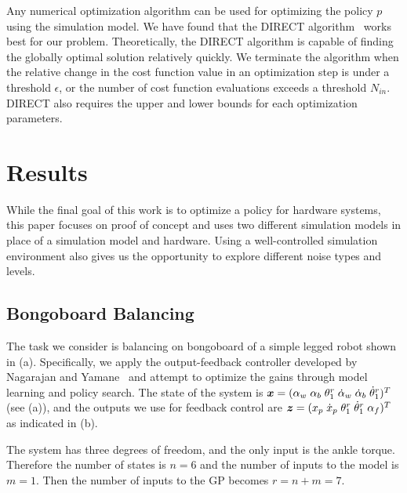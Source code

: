 Any numerical optimization algorithm can be used for optimizing the
policy $p$ using the simulation model.
We have found that the DIRECT algorithm~\cite{bib-jones-direct} works
best for our problem.
Theoretically, the DIRECT algorithm is capable of finding the globally
optimal solution relatively quickly.
We terminate the algorithm when the relative change in the cost function
value in an optimization step is under a threshold $\epsilon$, or the
number of cost function evaluations exceeds a threshold $N_{in}$.
DIRECT also requires the upper and lower bounds for each optimization
parameters.

\section{Results}  \label{sec:learning_results}

While the final goal of this work is to optimize a policy for hardware
systems, this paper focuses on proof of concept and uses two different
simulation models in place of a simulation model and hardware.
Using a well-controlled simulation environment also gives us the
opportunity to explore different noise types and levels.

\subsection{Bongoboard Balancing}

The task we consider is balancing on bongoboard of a simple legged
robot shown in (a).
Specifically, we apply the output-feedback controller developed by
Nagarajan and Yamane~\cite{bib-icra14-universal} and attempt to optimize
the gains through model learning and policy search.
The state of the system is $\mbox{\boldmath \(x\)} = (\alpha_w\; \alpha_b\;
\theta_1^r\; \dot{\alpha}_w\; \dot{\alpha}_b\; \dot{\theta}_1^r)^T$ (see
(a)), and the outputs we use for feedback control
are 
$\mbox{\boldmath \(z\)} = (x_p\; \dot{x}_p\; \theta_1^r\; \dot{\theta}_1^r\; \alpha_f)^T$ as
indicated in (b).

The system has three degrees of freedom, and the only input is the
ankle torque.
Therefore the number of states is $n = 6$ and the number of inputs to
the model is $m=1$.
Then the number of inputs to the GP becomes $r=n+m=7$.

